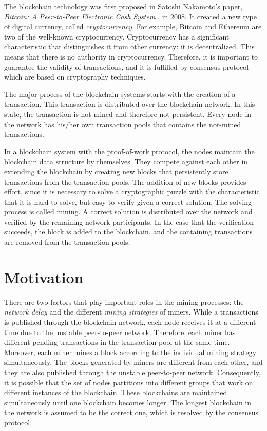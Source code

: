 The blockchain technology was first proposed in Satoshi Nakamoto’s paper, \textit{Bitcoin: A Peer-to-Peer Electronic Cash System} \cite{Nakamoto2008}, in 2008. It created a new type of digital currency, called \textit{cryptocurrency}. For example, Bitcoin \cite{bitcoin} and Ethereum \cite{ethereum} are two of the well-known cryptocurrency. Cryptocurrency has a significant characteristic that distinguishes it from other currency: it is decentralized. This means that there is no authority in cryptocurrency. Therefore, it is important to guarantee the validity of transactions, and it is fulfilled by consensus protocol which are based on cryptography techniques. \cite{Narayanan2016}

The major process of the blockchain systems starts with the creation of a transaction. This transaction is distributed over the blockchain network. In this state, the transaction is not-mined and therefore not persistent. Every node in the network has his/her own transaction pools that contains the not-mined transactions.

In a blockchain system with the proof-of-work protocol, the nodes maintain the blockchain data structure by themselves. They compete against each other in extending the blockchain by creating new blocks that persistently store transactions from the transaction pools. The addition of new blocks provides effort, since it is necessary to solve a cryptographic puzzle with the characteristic that it is hard to solve, but easy to verify given a correct solution. The solving process is called mining. A correct solution is distributed over the network and verified by the remaining network participants. In the case that the verification succeeds, the block is added to the blockchain, and the containing transactions are removed from the transaction pools.

\section{Motivation}

There are two factors that play important roles in the mining processes: the \textit{network delay} and the different \textit{mining strategies} of miners. While a transactions is published through the blockchain network, each node receives it at a different time due to the unstable peer-to-peer network. Therefore, each miner has different pending transactions in the transaction pool at the same time. Moreover, each miner mines a block according to the individual mining strategy simultaneously. The blocks generated by miners are different from each other, and they are also published through the unstable peer-to-peer network. Consequently, it is possible that the set of nodes partitions into different groups that work on different instances of the blockchain. These blockchains are maintained simultaneously until one blockchain becomes longer. The longest blockchain in the network is assumed to be the correct one, which is resolved by the consensus protocol.

